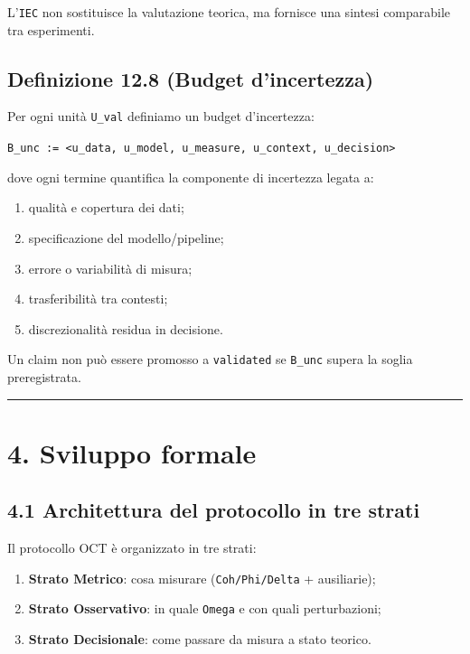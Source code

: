 L'\texttt{IEC} non sostituisce la valutazione teorica, ma fornisce una sintesi comparabile tra esperimenti.

\subsection{Definizione 12.8 (Budget d'incertezza)}

Per ogni unità \texttt{U\_val} definiamo un budget d'incertezza:

\texttt{B\_unc\ :=\ \textless{}u\_data,\ u\_model,\ u\_measure,\ u\_context,\ u\_decision\textgreater{}}

dove ogni termine quantifica la componente di incertezza legata a:

\begin{enumerate}
\def\labelenumi{\arabic{enumi}.}
\tightlist
\item
  qualità e copertura dei dati;
\item
  specificazione del modello/pipeline;
\item
  errore o variabilità di misura;
\item
  trasferibilità tra contesti;
\item
  discrezionalità residua in decisione.
\end{enumerate}

Un claim non può essere promosso a \texttt{validated} se \texttt{B\_unc} supera la soglia preregistrata.

\begin{center}\rule{0.5\linewidth}{0.5pt}\end{center}

\section{4. Sviluppo formale}

\subsection{4.1 Architettura del protocollo in tre strati}

Il protocollo OCT è organizzato in tre strati:

\begin{enumerate}
\def\labelenumi{\arabic{enumi}.}
\tightlist
\item
  \textbf{Strato Metrico}: cosa misurare (\texttt{Coh/Phi/Delta} + ausiliarie);
\item
  \textbf{Strato Osservativo}: in quale \texttt{Omega} e con quali perturbazioni;
\item
  \textbf{Strato Decisionale}: come passare da misura a stato teorico.
\end{enumerate}

